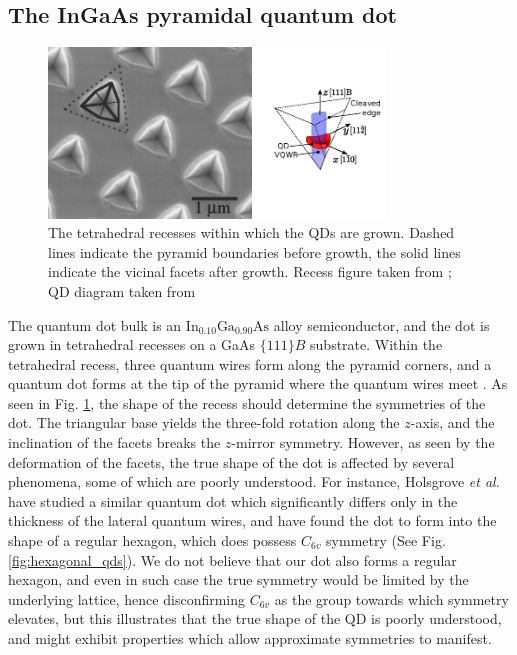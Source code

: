 \documentclass[12pt]{article}
\begin{document}
\subsection{The InGaAs pyramidal quantum dot} \label{sec:growth}
\begin{figure} \label{fig:pyramidal_qds}
\begin{center}

    \includegraphics[width=0.8\textwidth]{figures/pyramidal_qds}
 \caption{The tetrahedral recesses within which the QDs are grown. Dashed lines indicate the pyramid boundaries before growth, the solid lines indicate the vicinal facets after growth. Recess figure taken from \cite[Fig. 1]{pyramidal_qds}; QD diagram taken from \cite[Fig. 1]{karlsson}}
\end{center}
\end{figure}

The quantum dot bulk is an $\text{In}_{0.10}\text{Ga}_{0.90}\text{As}$ alloy semiconductor, and the dot is grown in tetrahedral recesses on a GaAs $\{111\}B$ substrate. Within the tetrahedral recess, three quantum wires form along the pyramid corners, and a quantum dot forms at the tip of the pyramid where the quantum wires meet \cite{pyramidal_qds}. As seen in Fig. \ref{fig:pyramidal_qds}, the shape of the recess should determine the symmetries of the dot. The triangular base yields the three-fold rotation along the $z$-axis, and the inclination of the facets breaks the $z$-mirror symmetry. However, as seen by the deformation of the facets, the true shape of the dot is affected by several phenomena, some of which are poorly understood. For instance, Holsgrove \textit{et al.} have studied a similar quantum dot which significantly differs only in the thickness of the lateral quantum wires, and have found the dot to form into the shape of a regular hexagon, which does possess $C_{6v}$ symmetry \cite{hexagon} (See Fig. \ref{fig:hexagonal_qds}). We do not believe that our dot also forms a regular hexagon, and even in such case the true symmetry would be limited by the underlying lattice, hence disconfirming $C_{6v}$ as the group towards which symmetry elevates, but this illustrates that the true shape of the QD is poorly understood, and might exhibit properties which allow approximate symmetries to manifest.
\end{document}
